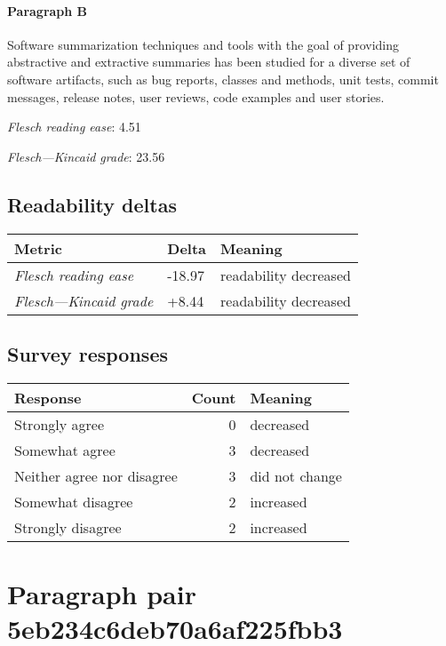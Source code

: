 \paragraph{Paragraph B}
Software summarization techniques and tools with the goal of providing abstractive and extractive summaries has been studied for a diverse set of software artifacts, such as bug reports, classes and methods, unit tests, commit messages, release notes, user reviews, code examples and user stories.\par\medskip
\emph{Flesch reading ease}: 4.51\par
\emph{Flesch---Kincaid grade}: 23.56

\subsection{Readability deltas}

\begin{tabular}{lll}
\toprule
               \textbf{Metric} & \textbf{Delta} &       \textbf{Meaning} \\
\midrule
    \emph{Flesch reading ease} &         -18.97 &  readability decreased \\
 \emph{Flesch---Kincaid grade} &          +8.44 &  readability decreased \\
\bottomrule
\end{tabular}

\subsection{Survey responses}
\begin{tabular}{lrl}
\toprule
          \textbf{Response} &  \textbf{Count} & \textbf{Meaning} \\
\midrule
             Strongly agree &               0 &        decreased \\
             Somewhat agree &               3 &        decreased \\
 Neither agree nor disagree &               3 &   did not change \\
          Somewhat disagree &               2 &        increased \\
          Strongly disagree &               2 &        increased \\
\bottomrule
\end{tabular}

\section{Paragraph pair 5eb234c6deb70a6af225fbb3}
